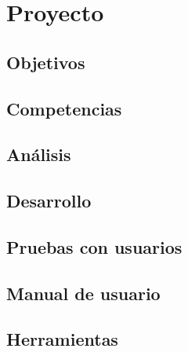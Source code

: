 \section{Proyecto}
\subsection{Objetivos}

\subsection{Competencias}

\subsection{Análisis}

\subsection{Desarrollo}

\subsection{Pruebas con usuarios}

\subsection{Manual de usuario}
 \label{manual}
\subsection{Herramientas}
